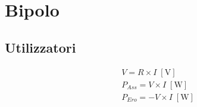 \documentclass{article}
\begin{document}
    \section*{Bipolo}

        \begin{minipage}[t]{.3\textwidth}
            \vspace{-\baselineskip}

            \subsection*{Utilizzatori}

                \begin{minipage}[t]{.2\textwidth}
                    \vspace{-\baselineskip}

                    
                \end{minipage}
                \hfill
                \begin{minipage}[t]{.8\textwidth}
                    \vspace{-\baselineskip}

                    \begin{align*}
                        &V = R \times I \; [\mathrm{V}]\\
                        &P_{Ass} = V \times I \; [\mathrm{W}]\\
                        &P_{Ero} = - V \times I \; [\mathrm{W}]
                    \end{align*}
                \end{minipage}

        \end{minipage}
        \hfill
\end{document}
